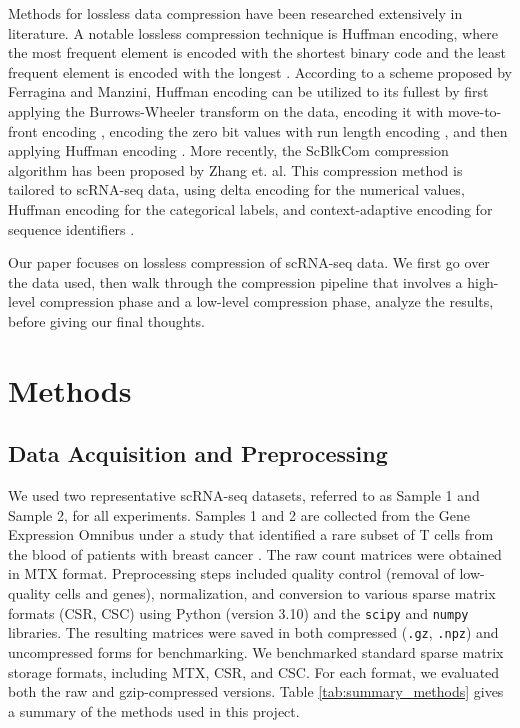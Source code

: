 \documentclass[unnumsec,webpdf,contemporary,large]{oup-authoring-template}
\begin{document}
Methods for lossless data compression have been researched extensively in literature. A notable lossless compression technique is Huffman encoding, where the most frequent element is encoded with the shortest binary code and the least frequent element is encoded with the longest \cite{huffman}. According to a scheme proposed by Ferragina and Manzini, Huffman encoding can be utilized to its fullest by first applying the Burrows-Wheeler transform \cite{BWT} on the data, encoding it with move-to-front encoding \cite{mtf-encoding}, encoding the zero bit values with run length encoding \cite{rle-bioinformatics}, and then applying Huffman encoding \cite{fm-index}. More recently, the ScBlkCom compression algorithm has been proposed by Zhang et. al. This compression method is tailored to scRNA-seq data, using delta encoding for the numerical values, Huffman encoding for the categorical labels, and context-adaptive encoding for sequence identifiers \cite{ScBlkCom}.

Our paper focuses on lossless compression of scRNA-seq data. We first go over the data used, then walk through the compression pipeline that involves a high-level compression phase and a low-level compression phase, analyze the results, before giving our final thoughts.

\section{Methods}

\subsection{Data Acquisition and Preprocessing}
We used two representative scRNA-seq datasets, referred to as Sample 1 and Sample 2, for all experiments. Samples 1 and 2 are collected from the Gene Expression Omnibus under a study that identified a rare subset of T cells from the blood of patients with breast cancer \cite{dataset}. The raw count matrices were obtained in MTX format. Preprocessing steps included quality control (removal of low-quality cells and genes), normalization, and conversion to various sparse matrix formats (CSR, CSC) using Python (version 3.10) and the \texttt{scipy} and \texttt{numpy} libraries. The resulting matrices were saved in both compressed (\texttt{.gz}, \texttt{.npz}) and uncompressed forms for benchmarking. We benchmarked standard sparse matrix storage formats, including MTX, CSR, and CSC. For each format, we evaluated both the raw and gzip-compressed versions. Table \ref{tab:summary_methods} gives a summary of the methods used in this project.
\end{document}
